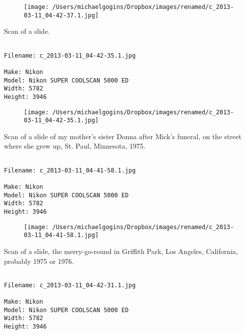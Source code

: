 \documentclass[11pt,letter,DIV=14,paper=landscape]{scrbook}
\begin{document}
\begin{figure}
\texttt{[image: /Users/michaelgogins/Dropbox/images/renamed/c\_2013-03-11\_04-42-37.1.jpg]}
\end{figure}
    
\clearpage
\noindent Scan of a slide.
\noindent
\begin{lstlisting}

Filename: c_2013-03-11_04-42-35.1.jpg

Make: Nikon
Model: Nikon SUPER COOLSCAN 5000 ED
Width: 5782
Height: 3946
\end{lstlisting}
\clearpage

\begin{figure}
\texttt{[image: /Users/michaelgogins/Dropbox/images/renamed/c\_2013-03-11\_04-42-35.1.jpg]}
\end{figure}
    
\clearpage
\noindent Scan of a slide of my mother's sister Donna after Mick's funeral, on the street where she grew up, St. Paul, Minnesota, 1975.
\noindent
\begin{lstlisting}

Filename: c_2013-03-11_04-41-58.1.jpg

Make: Nikon
Model: Nikon SUPER COOLSCAN 5000 ED
Width: 5782
Height: 3946
\end{lstlisting}
\clearpage

\begin{figure}
\texttt{[image: /Users/michaelgogins/Dropbox/images/renamed/c\_2013-03-11\_04-41-58.1.jpg]}
\end{figure}
    
\clearpage
\noindent Scan of a slide, the merry-go-round in Griffith Park, Los Angeles, California, probably 1975 or 1976.
\noindent
\begin{lstlisting}

Filename: c_2013-03-11_04-42-31.1.jpg

Make: Nikon
Model: Nikon SUPER COOLSCAN 5000 ED
Width: 5782
Height: 3946
\end{lstlisting}
\clearpage
\end{document}
